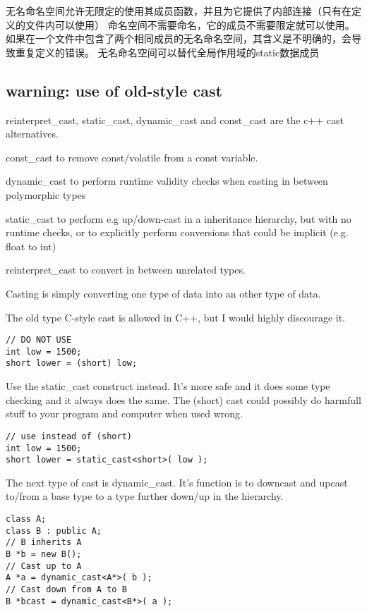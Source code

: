 无名命名空间允许无限定的使用其成员函数，并且为它提供了内部连接（只有在定义的文件内可以使用）
命名空间不需要命名，它的成员不需要限定就可以使用。
如果在一个文件中包含了两个相同成员的无名命名空间，其含义是不明确的，会导致重复定义的错误。
无名命名空间可以替代全局作用域的static数据成员

\subsection{warning: use of old-style cast}
reinterpret\_cast, static\_cast, dynamic\_cast and const\_cast are the c++ cast alternatives.

const\_cast to remove const/volatile from a const variable.

dynamic\_cast to perform runtime validity checks when casting in between polymorphic types

static\_cast to perform e.g up/down-cast in a inheritance hierarchy, but with no runtime checks, or to explicitly perform conversions that could be implicit (e.g. float to int)

reinterpret\_cast to convert in between unrelated types.

Casting is simply converting one type of data into an other type of data.

The old type C-style cast is allowed in C++, but I would highly discourage it.

\begin{lstlisting}
// DO NOT USE
int low = 1500;
short lower = (short) low;    
\end{lstlisting}

Use the static\_cast construct instead. It’s more safe and it does some type checking and it always does the same. The (short) cast could possibly do harmfull stuff to your program and computer when used wrong.

\begin{lstlisting}
// use instead of (short)
int low = 1500;
short lower = static_cast<short>( low );    
\end{lstlisting}

The next type of cast is dynamic\_cast. It’s function is to downcast and upcast to/from a base type to a type further down/up in the hierarchy.

\begin{lstlisting}
class A;
class B : public A;
// B inherits A
B *b = new B();
// Cast up to A
A *a = dynamic_cast<A*>( b );
// Cast down from A to B
B *bcast = dynamic_cast<B*>( a );   
\end{lstlisting}

